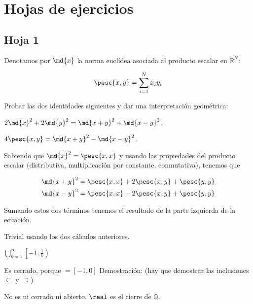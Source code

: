 \section{Hojas de ejercicios}

\subsection{Hoja 1}

\begin{problem}[1] Denotamos por $\md{x}$ la norma euclídea asociada al producto escalar en $ℝ^N$:

\[ \pesc{x,y} = \sum_{i=1}^Nx_iy_i \]

Probar las dos identidades siguientes y dar una interpretación geométrica:

\ppart $2\md{x}^2 + 2\md{y}^2 = \md{x+y}^2 + \md{x-y}^2$.

\ppart $4\pesc{x,y} = \md{x+y}^2 - \md{x-y}^2$.

\solution

\spart Sabiendo que $\md{x}^2 = \pesc{x,x}$ y usando las propiedades del producto escalar (distributiva, multiplicación por constante, conmutativa), tenemos que 

\begin{gather*}
\md{x+y}^2 = \pesc{x,x} + 2\pesc{x,y} + \pesc{y,y} \\ 
\md{x-y}^2 = \pesc{x,x} - 2\pesc{x,y} + \pesc{y,y} 
\end{gather*}

Sumando estos dos términos tenemos el resultado de la parte izquierda de la ecuación.

\spart Trivial usando los dos cálculos anteriores.

\end{problem}

\begin{problem}[3] 
\solution
\spart

$\displaystyle\bigcup_{k=1}^{\infty} \left[-1,\frac{1}{k}\right)$

Es cerrado, porque $=[-1,0]$
Demostración: (hay que demostrar las inclusiones $\subseteq$ y $\supseteq$)

\spart
No es ni cerrado ni abierto.
\obs $\real$ es el cierre de $\mathbb{Q}$.

\spart
 
\end{problem}


